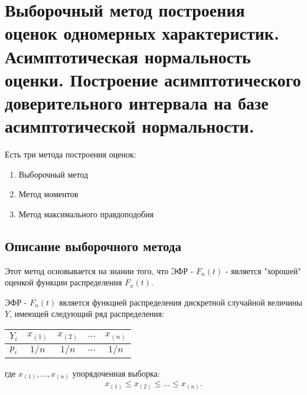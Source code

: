 \section{Выборочный метод построения оценок одномерных характеристик. Асимптотическая нормальность оценки. Построение асимптотического доверительного интервала на базе асимптотической нормальности.}

Есть три метода построения оценок: \\

\begin{enumerate}
  \item Выборочный метод
  \item Метод моментов
  \item Метод максимального правдоподобия
\end{enumerate}


\subsection{Описание выборочного метода}

Этот метод основывается на знании того, что ЭФР - $F_n(t)$ - является "хорошей" оценкой функции распределения $F_x(t)$.

ЭФР - $F_n(t)$ является функцией распределения дискретной случайной величины $Y$, имеющей следующий ряд распределения:


\begin{center}
\begin{tabular}{ c|c|c|c|c }
  $Y_i$ & $x_{(1)}$ & $x_{(2)}$ & $...$ & $x_{(n)}$ \\
 \hline
 $p_i$ & $1/n$ & $1/n$ & $...$ & $1/n$ \\
\end{tabular}
\end{center}

где $x_{(1)}, ..., x_{(n)}$ упорядоченная выборка:
\[
  x_{(1)} \le x_{(2)} \le ... \le x_{(n)}
.\]
